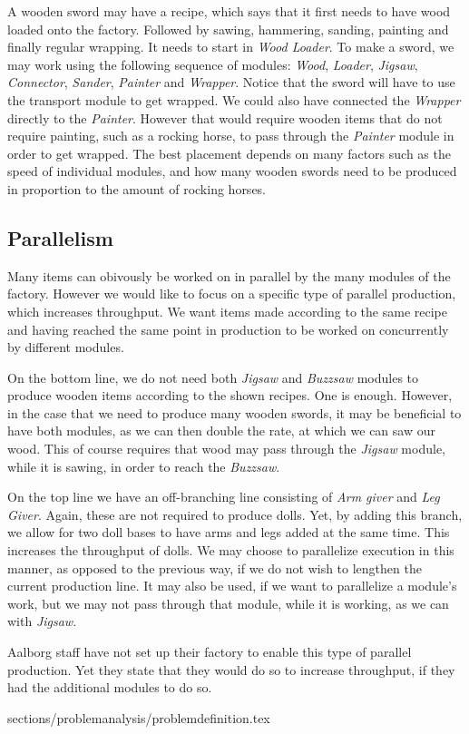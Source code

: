 A wooden sword may have a recipe, which says that it first needs to have wood loaded onto the factory. Followed by sawing, hammering, sanding, painting and finally regular wrapping. It needs to start in \textit{Wood Loader}. To make a sword, we may work using the following sequence of modules: \textit{Wood}, \textit{Loader}, \textit{Jigsaw}, \textit{Connector}, \textit{Sander}, \textit{Painter} and \textit{Wrapper}. Notice that the sword will have to use the transport module to get wrapped. We could also have connected the \textit{Wrapper} directly to the \textit{Painter}. However that would require wooden items that do not require painting, such as a rocking horse, to pass through the \textit{Painter} module in order to get wrapped. The best placement depends on many factors such as the speed of individual modules, and how many wooden swords need to be produced in proportion to the amount of rocking horses.

\subsection{Parallelism}
Many items can obivously be worked on in parallel by the many modules of the factory. However we would like to focus on a specific type of parallel production, which increases throughput. We want items made according to the same recipe and having reached the same point in production to be worked on concurrently by different modules.  

On the bottom line, we do not need both \textit{Jigsaw} and \textit{Buzzsaw} modules to produce wooden items according to the shown recipes. One is enough. However, in the case that we need to produce many wooden swords, it may be beneficial to have both modules, as we can then double the rate, at which we can saw our wood. This of course requires that wood may pass through the \textit{Jigsaw} module, while it is sawing, in order to reach the \textit{Buzzsaw}.

On the top line we have an off-branching line consisting of \textit{Arm giver} and \textit{Leg Giver}. Again, these are not required to produce dolls. Yet, by adding this branch, we allow for two doll bases to have arms and legs added at the same time. This increases the throughput of dolls. We may choose to parallelize execution in this manner, as opposed to the previous way, if we do not wish to lengthen the current production line. It may also be used, if we want to parallelize a module's work, but we may not pass through that module, while it is working, as we can with \textit{Jigsaw}.

Aalborg staff have not set up their factory to enable this type of parallel production. Yet they state that they would do so to increase throughput, if they had the additional modules to do so. 

 {sections/problemanalysis/problemdefinition.tex}

